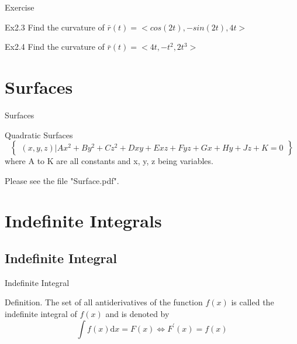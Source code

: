 \documentclass[aspectratio=169, UTF8]{ctexbeamer}
\begin{document}
    \begin{frame}[t]{Exercise}
        \par \textcolor{yy}{Ex2.3} Find the curvature of $\bar{r}(t)=<cos(2t),-sin(2t),4t>$\\
        \par \textcolor{yy}{Ex2.4} Find the curvature of $\bar{r}(t)=<4t,-t^{2},2t^3>$\\
    \end{frame}

 
\section{Surfaces}
    
    
    \begin{frame}{Surfaces}
    \par \textcolor{yy}{Quadratic Surfaces}
    \begin{equation*}
        \begin{Bmatrix}
        {(x,y,z) | Ax^2 + By^2 + Cz^2 + Dxy + Exz + Fyz + Gx + Hy + Jz + K = 0}
        \end{Bmatrix}
    \end{equation*}
    where A to K are all constants and x, y, z being variables.
    \par Please see the file "Surface.pdf".
    \end{frame}
 
\section{Indefinite Integrals}
    

    \subsection{Indefinite Integral}
    \begin{frame}[t]{Indefinite Integral}
        \begin{block}
            \par \textcolor{yy}{Definition.} The set of all antiderivatives of the function $f(x)$ is called the \textcolor{yy}{indefinite integral} of $f(x)$ and is denoted by $$\int f(x) \mathrm{d}x=F(x) \Leftrightarrow F^{\prime}(x)=f(x)$$
        \end{block}
    \end{frame}
\end{document}
